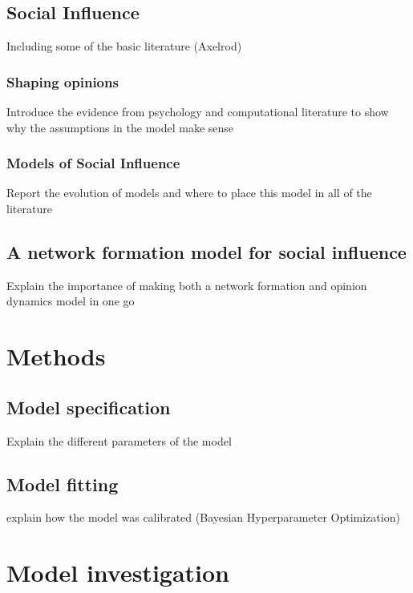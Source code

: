 \documentclass[9pt,twocolumn,twoside]{ilcss}
\begin{document}
\subsection{Social Influence}

Including some of the basic literature (Axelrod)

\subsubsection{Shaping opinions}

Introduce the evidence from psychology and computational literature to show why the assumptions in the model make sense

\subsubsection{Models of Social Influence}

Report the evolution of models and where to place this model in all of the literature

\subsection{A network formation model for social influence}

Explain the importance of making both a network formation and opinion dynamics model in one go

\section{Methods}

\subsection{Model specification}

Explain the different parameters of the model

\subsection{Model fitting}

explain how the model was calibrated (Bayesian Hyperparameter Optimization)

\section{Model investigation}
\end{document}
